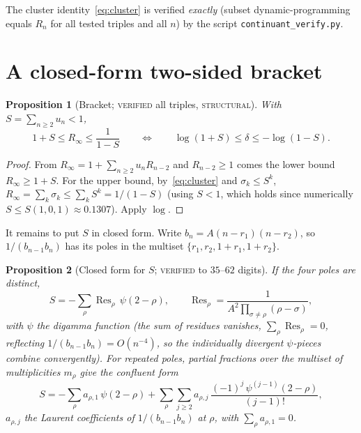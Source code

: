 \documentclass[11pt]{article}
\newtheorem{proposition}{Proposition}
\newcommand{\Rinf}{R_\infty}
\DeclareMathOperator{\Res}{Res}
\begin{document}
The cluster identity~\eqref{eq:cluster} is verified \emph{exactly} (subset
dynamic-programming equals $R_n$ for all tested triples and all $n$) by the script
\texttt{continuant\_verify.py}.

\section{A closed-form two-sided bracket}\label{sec:bracket}

\begin{proposition}[Bracket; \textsc{verified} all triples, \textsc{structural}]
\label{prop:bracket}
With $S=\sum_{n\ge2}u_n<1$,
\[
  1+S\le\Rinf\le\frac{1}{1-S}
  \qquad\Longleftrightarrow\qquad
  \log(1+S)\le\delta\le-\log(1-S).
\]
\end{proposition}

\begin{proof}
From $\Rinf=1+\sum_{n\ge2}u_nR_{n-2}$ and $R_{n-2}\ge1$ comes the lower bound
$\Rinf\ge1+S$. For the upper bound, by~\eqref{eq:cluster} and $\sigma_k\le S^k$,
$\Rinf=\sum_k\sigma_k\le\sum_k S^k=1/(1-S)$ (using $S<1$, which holds since
numerically $S\le S(1,0,1)\approx0.1307$). Apply $\log$.
\end{proof}

It remains to put $S$ in closed form. Write $b_n=A(n-r_1)(n-r_2)$, so
$1/(b_{n-1}b_n)$ has its poles in the multiset $\{r_1,r_2,1+r_1,1+r_2\}$.

\begin{proposition}[Closed form for $S$; \textsc{verified} to $35$--$62$ digits]
\label{prop:S}
If the four poles are distinct,
\begin{equation}\label{eq:Sdigamma}
  S=-\sum_{\rho}\Res_\rho\,\psi(2-\rho),\qquad
  \Res_\rho=\frac{1}{A^2\prod_{\sigma\ne\rho}(\rho-\sigma)},
\end{equation}
with $\psi$ the digamma function (the sum of residues vanishes, $\sum_\rho\Res_\rho=0$,
reflecting $1/(b_{n-1}b_n)=O(n^{-4})$, so the individually divergent $\psi$-pieces
combine convergently). For repeated poles, partial fractions over the multiset of
multiplicities $m_\rho$ give the confluent form
\begin{equation}\label{eq:Sconfluent}
  S=-\sum_\rho a_{\rho,1}\,\psi(2-\rho)
    +\sum_\rho\sum_{j\ge2}a_{\rho,j}\,
       \frac{(-1)^j\,\psi^{(j-1)}(2-\rho)}{(j-1)!},
\end{equation}
$a_{\rho,j}$ the Laurent coefficients of $1/(b_{n-1}b_n)$ at $\rho$, with
$\sum_\rho a_{\rho,1}=0$.
\end{proposition}
\end{document}
